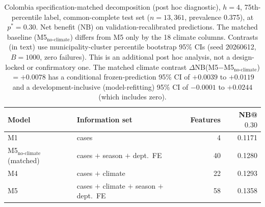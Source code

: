 \documentclass[11pt,a4paper]{article}
\begin{document}
\begin{table}[H]
\centering
\caption{Colombia specification-matched decomposition (post hoc diagnostic), $h=4$, 75th-percentile label, common-complete test set ($n=13{,}361$, prevalence 0.375), at $p^*=0.30$. Net benefit (NB) on validation-recalibrated predictions. The matched baseline (M5$_{\text{no-climate}}$) differs from M5 only by the 18 climate columns. Contrasts (in text) use municipality-cluster percentile bootstrap 95\% CIs (seed 20260612, $B=1000$, zero failures). This is an additional post hoc analysis, not a design-locked or confirmatory one. The matched climate contrast $\Delta$NB(M5$-$M5$_{\text{no-climate}}$)$=+0.0078$ has a conditional frozen-prediction 95\% CI of $+0.0039$ to $+0.0119$ and a development-inclusive (model-refitting) 95\% CI of $-0.0001$ to $+0.0244$ (which includes zero).}
\label{tab:matcheddecomp}
\begin{tabular}{llrr}
\toprule
Model & Information set & Features & NB@$0.30$ \\
\midrule
M1 & cases & 4 & 0.1171 \\
M5$_{\text{no-climate}}$ (matched) & cases $+$ season $+$ dept.\ FE & 40 & 0.1280 \\
M4 & cases $+$ climate & 22 & 0.1293 \\
M5 & cases $+$ climate $+$ season $+$ dept.\ FE & 58 & 0.1358 \\
\bottomrule
\end{tabular}
\end{table}
\end{document}
